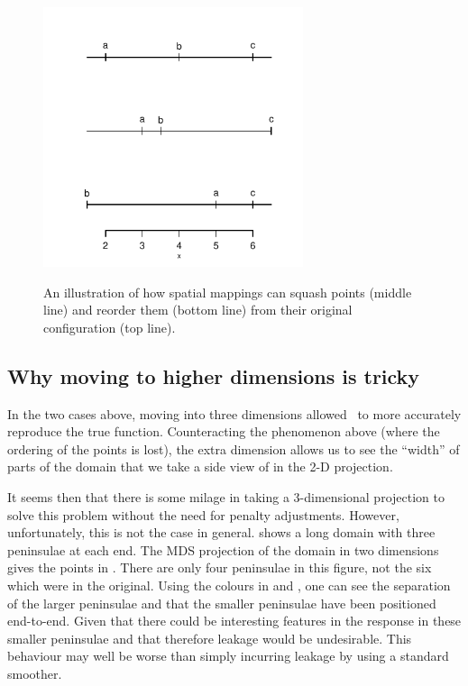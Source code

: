 \begin{figure}
\centering
\includegraphics[width=3in]{mds/figs/linedia.pdf} \\
\caption{An illustration of how spatial mappings can squash points (middle line) and reorder them (bottom line) from their original configuration (top line).}
\label{linedia}
\end{figure}

\subsection{Why moving to higher dimensions is tricky}
\label{nohigherdim}

In the two cases above, moving into three dimensions allowed \mdsap\ to more accurately reproduce the true function. Counteracting the phenomenon above (where the ordering of the points is lost), the extra dimension allows us to see the ``width'' of parts of the domain that we take a side view of in the 2-D projection.

It seems then that there is some milage in taking a 3-dimensional projection to solve this problem without the need for penalty adjustments. However, unfortunately, this is not the case in general.  shows a long domain with three peninsulae at each end. The MDS projection of the domain in two dimensions gives the points in . There are only four peninsulae in this figure, not the six which were in the original. Using the colours in  and , one can see the separation of the larger peninsulae and that the smaller peninsulae have been positioned end-to-end. Given that there could be interesting features in the response in these smaller peninsulae and that therefore leakage would be undesirable. This behaviour may well be worse than simply incurring leakage by using a standard smoother.

